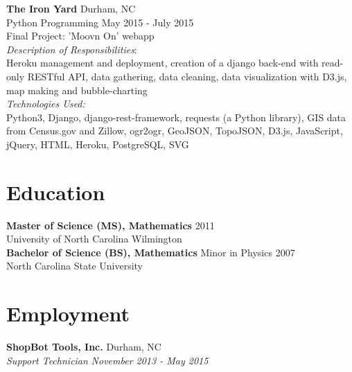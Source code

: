 \documentclass[11pt]{article}
\begin{document}
{\bf The Iron Yard} \hfill Durham, NC\\
Python Programming \hfill {May 2015 - July 2015}
\vspace{5pt}\\
Final Project: 'Moovn On' webapp\\
{\it Description of Responsibilities}:\\
Heroku management and deployment, creation of a django back-end with read-only RESTful API, data gathering, data cleaning, data visualization with D3.js, map making and bubble-charting\\
{\it Technologies Used:}\\
Python3, Django, django-rest-framework, requests (a Python library), GIS data from Census.gov and Zillow, ogr2ogr, GeoJSON, TopoJSON, D3.js, JavaScript, jQuery, HTML, Heroku, PostgreSQL, SVG


\section*{Education}

{\bf Master of Science (MS), Mathematics} \hfill 2011\\
University of North Carolina Wilmington
\vspace{5pt}\\
\noindent
{\bf Bachelor of Science (BS), Mathematics} Minor in Physics \hfill 2007\\
North Carolina State University


\section*{Employment}


\noindent
{\bf ShopBot Tools, Inc.} \hfill Durham, NC\\
{\it Support Technician} \hfill {\it November 2013 - May 2015}
\end{document}
